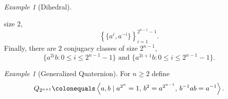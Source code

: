 \documentclass{dcthesis}
\newcommand{\mm}[1]{{\color{blue} \sf MM: [#1]}}
\numberwithin{equation}{section}
\theoremstyle{definition}
\theoremstyle{remark}
\newtheorem{example}[equation]{Example}
\begin{document}
{{{\begin{example}[Dihedral]
\begin{itemize}
          size $2$,
          \begin{equation}
            \label{eqn:conjclassesdihedral}
            \left\{
              \{a^i,a^{-i}\}
            \right\}
            _{i=1}^{2^{n-1}-1}.
          \end{equation}
          Finally, there are
          $2$ conjugacy classes of
          size $2^{n-1}$,
          \begin{equation}
            \label{eqn:conjclassesdihedralbiggest}
            \{a^{2i}b : 0\leq i\leq 2^{n-1}-1\}
            \text{ and }
            \{a^{2i+1}b : 0\leq i\leq 2^{n-1}-1\}.
          \end{equation}
      \end{itemize}
    \end{example}
    \begin{example}[Generalized Quaternion]
      \label{exm:generalizedquaternion}
      For $n\geq 2$ define
      \begin{equation}
        \label{eqn:quaternionpresentation}
        Q_{2^{n+1}}
        \colonequals
        \left\langle
          a,b\mid
          a^{2^n}=1,\,
          b^2=a^{2^{n-1}},\,
          b^{-1}ab=a^{-1}
        \right\rangle.
      \end{equation}

\end{example}}}}
\end{document}
